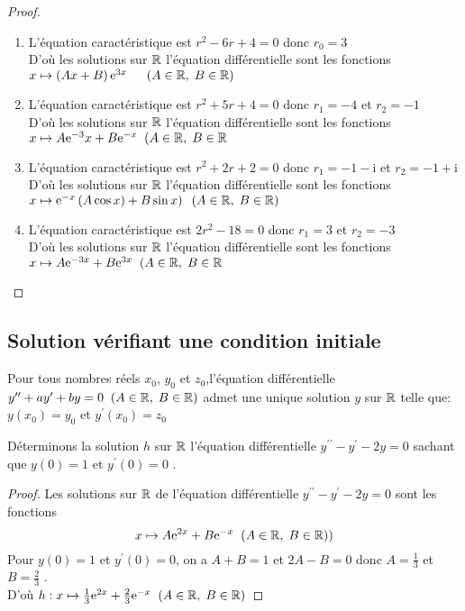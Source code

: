 \begin{proof}
 \begin{enumerate}
  \item
 L'équation caractéristique est $ r^{2}-6r+4=0 $ donc $ r_{0}=3 $\\D'où  les solutions sur $ \mathbb{R} $ l'équation différentielle sont les fonctions\; $ x\mapsto \left(Ax+B\right)\mathrm{e}^{3x}\quad  \;\;(A\in\mathbb{R},\; B\in\mathbb{R}) $\\
   \item L'équation caractéristique est $ r^{2}+5r+4=0 $ donc $ r_{1}=-4 $  et $ r_{2} =-1$\\D'où  les solutions sur $ \mathbb{R} $ l'équation différentielle sont les fonctions\; $ x\mapsto A\mathrm{e}^{-3}x+B\mathrm{e}^{-x} \;\;(A\in\mathbb{R},\; B\in\mathbb{R} $\\
 
   \item L'équation caractéristique est $ r^{2}+2r+2=0 $ donc $ r_{1}=-1-\mathrm{i} $  et $ r_{2} =-1+ \mathrm{i} $\\D'où  les solutions sur $ \mathbb{R} $ l'équation différentielle sont les fonctions\; $ x\mapsto \mathrm{e}^{- x}\left( A\cos x)+B\sin x\right) \;\;(A\in\mathbb{R},\; B\in\mathbb{R}) $\\
  \item L'équation caractéristique est $ 2r^{2}-18=0 $ donc $ r_{1}=3 $  et $ r_{2} =-3$\\D'où  les solutions sur $ \mathbb{R} $ l'équation différentielle sont les fonctions\; $ x\mapsto A\mathrm{e}^{-3x}+B\mathrm{e}^{ 3x} \;\;(A\in\mathbb{R},\; B\in\mathbb{R} $
 \end{enumerate}
 \end{proof}
 \subsection*{Solution vérifiant une condition initiale}
\begin{property}
Pour tous nombres réels $x_{0} $, $ y_{0} $  et $z_{0} $,\;l'équation différentielle $ y^{\prime \prime}+ ay^{\prime}+by=0\;\;(A\in\mathbb{R},\; B\in\mathbb{R})$ admet une unique solution  $ y $ sur $ \mathbb{R} $ telle que: $ y(x_{0})=y_{0} $ et  $ y^{\prime}(x_{0})=z_{0} $
\end{property}
\begin{example}
Déterminons la solution $ h $ sur $ \mathbb{R} $ l'équation différentielle\;  $ y^{\prime \prime}-y^{\prime} -2y=0 $\; sachant que  $ y(0)=1 $ et $ y^{\prime}(0)=0 $ . 

\end{example}
\begin{proof}
 Les solutions sur $ \mathbb{R} $ de l'équation différentielle  \;$ y^{\prime \prime}-y^{\prime}-2y=0 $  sont les fonctions
$$ x\mapsto A\mathrm{e}^{2 x}+B\mathrm{e}^{-x} \;\;(A\in\mathbb{R},\; B\in\mathbb{R}))$$  
Pour  $ y(0)=1 $ et $ y^{\prime}(0)=0 $, on a $ A+B=1 $  et $ 2A-B=0 $ \; donc  $ A=\frac{1}{3}$ et $B=\frac{2}{3} $ . \\
D'où \; $ h: x\mapsto \frac{1}{3} \mathrm{e}^{2 x}+\frac{2}{3}\mathrm{e}^{-x} \;\;(A\in\mathbb{R},\; B\in\mathbb{R})$

\end{proof}

